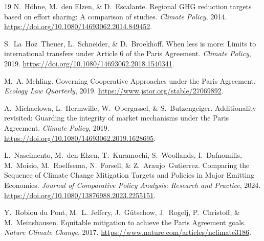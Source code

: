 \documentclass[12pt,english]{article}
\begin{document}
\begin{thebibliography}{19}
N.~H{\"o}hne, M.~{den Elzen}, \& D.~Escalante.
\newblock Regional {{GHG}} reduction targets based on effort sharing: A
  comparison of studies.
\newblock \emph{Climate Policy}, 2014.
\newblock \url{https://doi.org/10.1080/14693062.2014.849452}.

S.~La~Hoz~Theuer, L.~Schneider, \& D.~Broekhoff.
\newblock When less is more: Limits to international transfers under
  {{Article}} 6 of the {{Paris Agreement}}.
\newblock \emph{Climate Policy}, 2019.
\newblock \url{https://doi.org/10.1080/14693062.2018.1540341}.

M.~A. Mehling.
\newblock Governing {{Cooperative Approaches}} under the {{Paris Agreement}}.
\newblock \emph{Ecology Law Quarterly}, 2019.
\newblock \url{https://www.jstor.org/stable/27069892}.

A.~Michaelowa, L.~Hermwille, W.~Obergassel, \& S.~Butzengeiger.
\newblock Additionality revisited: Guarding the integrity of market mechanisms
  under the {{Paris Agreement}}.
\newblock \emph{Climate Policy}, 2019.
\newblock \url{https://doi.org/10.1080/14693062.2019.1628695}.

L.~Nascimento, M.~{den Elzen}, T.~Kuramochi, S.~Woollands, I.~Dafnomilis,
  M.~Moisio, M.~Roelfsema, N.~Forsell, \& Z.~Araujo~Gutierrez.
\newblock Comparing the {{Sequence}} of {{Climate Change Mitigation Targets}}
  and {{Policies}} in {{Major Emitting Economies}}.
\newblock \emph{Journal of Comparative Policy Analysis: Research and Practice},
  2024.
\newblock \url{https://doi.org/10.1080/13876988.2023.2255151}.

Y.~{Robiou du Pont}, M.~L. Jeffery, J.~G{\"u}tschow, J.~Rogelj, P.~Christoff,
  \& M.~Meinshausen.
\newblock Equitable mitigation to achieve the {{Paris Agreement}} goals.
\newblock \emph{Nature Climate Change}, 2017.
\newblock \url{https://www.nature.com/articles/nclimate3186}.


\end{thebibliography}
\end{document}
